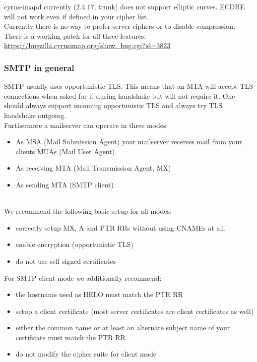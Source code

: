 cyrus-imapd currently (2.4.17, trunk) does not support elliptic curves. ECDHE will not work even if defined in your cipher list.\\

Currently there is no way to prefer server ciphers or to disable compression.\\

There is a working patch for all three features:
\url{https://bugzilla.cyrusimap.org/show_bug.cgi?id=3823}\\






\subsubsection{SMTP in general}

SMTP usually uses opportunistic TLS. This means that an MTA will accept TLS connections when asked for it during handshake but will not require it. One should always support incoming opportunistic TLS and always try TLS handshake outgoing.\\

Furthermore a mailserver can operate in three modes:
\begin{itemize}
\item As MSA (Mail Submission Agent) your mailserver receives mail from your clients MUAs (Mail User Agent).
\item As receiving MTA (Mail Transmission Agent, MX)
\item As sending MTA (SMTP client)
\end{itemize}
\mbox{}\\
We recommend the following basic setup for all modes:
\begin{itemize}
\item correctly setup MX, A and PTR RRs without using CNAMEs at all.
\item enable encryption (opportunistic TLS)
\item do not use self signed certificates
\end{itemize}

For SMTP client mode we additionally recommend:
\begin{itemize}
\item the hostname used as HELO must match the PTR RR
\item setup a client certificate (most server certificates are client certificates as well)
\item either the common name or at least an alternate subject name of your certificate must match the PTR RR
\item do not modify the cipher suite for client mode
\end{itemize}

